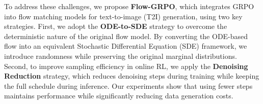 


To address these challenges, we propose \textbf{Flow-GRPO}, which integrates GRPO~\cite{grpo} into flow matching models for text-to-image (T2I) generation, using two key strategies.
First, we adopt the \textbf{ODE-to-SDE} strategy to overcome the deterministic nature of the original flow model. By converting the ODE-based flow into an equivalent Stochastic Differential Equation (SDE) framework, we introduce randomness while preserving the original marginal distributions.
Second, to improve sampling efficiency in online RL, we apply the \textbf{Denoising Reduction} strategy, which reduces denoising steps during training while keeping the full schedule during inference. Our experiments show that using fewer steps maintains performance while significantly reducing data generation costs.

